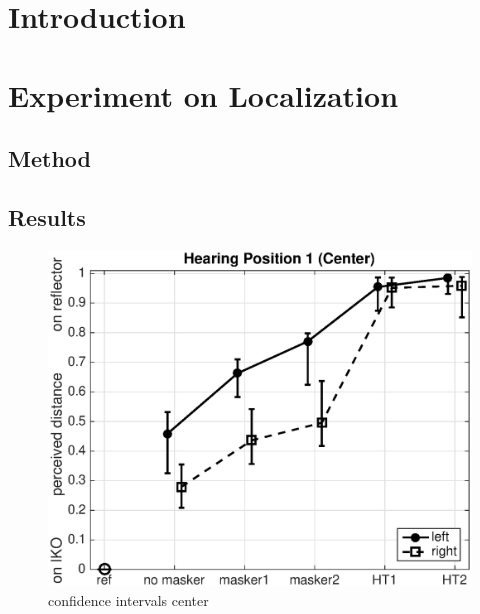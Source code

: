 \documentclass[a4paper, 10pt, twocolumn]{article}
\begin{document}
\section*{Introduction}
\label{sec:Introduction} 

\section*{Experiment on Localization}
\label{sec:Experiment on Localization} 

\subsection*{Method}
\label{sec:Method}


\subsection*{Results}
\label{sec:Results}

\begin{figure}[ht]
	\centering
	\includegraphics[scale=0.5]{./figures/center.eps}
	\caption{confidence intervals center}
\end{figure}
\end{document}
